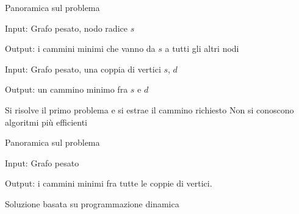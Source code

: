 \begin{frame}{Panoramica sul problema}

\vspace{-9pt}
\begin{myboxtitle}
\BI
\item \alert{Input}: Grafo pesato, nodo radice $s$ 
\item \alert{Output}: i cammini minimi che vanno da $s$ a tutti gli altri nodi
\EI
\end{myboxtitle}

\begin{myboxtitle}
\BI
\item \alert{Input}: Grafo pesato, una coppia di vertici $s$, $d$
\item \alert{Output}: un cammino minimo fra $s$ e $d$
\item Si risolve il primo problema e si estrae il cammino richiesto
Non si conoscono algoritmi più efficienti
\EI
\end{myboxtitle}

\end{frame}

\begin{frame}{Panoramica sul problema}

\vspace{-9pt}
\begin{myboxtitle}
\BI
\item \alert{Input}: Grafo pesato
\item \alert{Output}: i cammini minimi fra tutte le coppie di vertici. 
\item Soluzione basata su programmazione dinamica		
\EI
\end{myboxtitle}

\end{frame}

